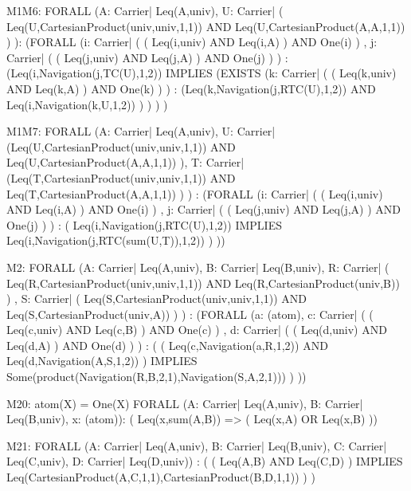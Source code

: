 \begin{verbnobox}[\tiny]
M1M6:
	FORALL (A: Carrier| Leq(A,univ), 
				    U: Carrier| ( Leq(U,CartesianProduct(univ,univ,1,1)) AND Leq(U,CartesianProduct(A,A,1,1)) ) ): 
	   (FORALL (i: Carrier|  (  ( Leq(i,univ) AND Leq(i,A) )  AND One(i) ) , 
				j: Carrier|  (  ( Leq(j,univ) AND Leq(j,A) )  AND One(j) ) ) :
		(Leq(i,Navigation(j,TC(U),1,2))
		IMPLIES 
			(EXISTS (k: Carrier|  (  ( Leq(k,univ) AND Leq(k,A) )  AND One(k) ) ) : 
				(Leq(k,Navigation(j,RTC(U),1,2)) AND Leq(i,Navigation(k,U,1,2)) ) ) ) )
\end{verbnobox}

\begin{verbnobox}[\tiny]
M1M7:
	FORALL (A: Carrier| Leq(A,univ), 
		   U: Carrier| (Leq(U,CartesianProduct(univ,univ,1,1)) AND Leq(U,CartesianProduct(A,A,1,1)) ),
		   T: Carrier| (Leq(T,CartesianProduct(univ,univ,1,1)) AND Leq(T,CartesianProduct(A,A,1,1)) ) ) : 
	  (FORALL (i: Carrier|  (  ( Leq(i,univ) AND Leq(i,A) )  AND One(i) ) , 
			   j: Carrier|  (  ( Leq(j,univ) AND Leq(j,A) )  AND One(j) ) ) : 
		  ( Leq(i,Navigation(j,RTC(U),1,2)) IMPLIES Leq(i,Navigation(j,RTC(sum(U,T)),1,2)) ) ))
\end{verbnobox}

\begin{verbnobox}[\tiny]
M2:	
	FORALL (A: Carrier| Leq(A,univ), 
		   B: Carrier| Leq(B,univ), 
		   R: Carrier| ( Leq(R,CartesianProduct(univ,univ,1,1)) AND Leq(R,CartesianProduct(univ,B)) ) , 
		   S: Carrier| ( Leq(S,CartesianProduct(univ,univ,1,1)) AND Leq(S,CartesianProduct(univ,A)) ) ) : 
	  (FORALL (a: (atom), 
			   c: Carrier| ( ( Leq(c,univ) AND Leq(c,B) )  AND One(c) ) , 
			   d: Carrier| ( ( Leq(d,univ) AND Leq(d,A) )  AND One(d) ) ) :  
			(  ( Leq(c,Navigation(a,R,1,2)) AND Leq(d,Navigation(A,S,1,2)) )  IMPLIES 
					Some(product(Navigation(R,B,2,1),Navigation(S,A,2,1))) ) ))
\end{verbnobox}

\begin{verbnobox}[\tiny]
M20:
 	atom(X) = One(X)
	FORALL (A: Carrier| Leq(A,univ), B: Carrier| Leq(B,univ), x: (atom)):
		 ( Leq(x,sum(A,B)) => ( Leq(x,A) OR Leq(x,B) ))
\end{verbnobox}

\begin{verbnobox}[\tiny]
M21:
	FORALL (A: Carrier| Leq(A,univ), 
		   B: Carrier| Leq(B,univ), 
		   C: Carrier| Leq(C,univ), 
		   D: Carrier| Leq(D,univ)) :
  ( ( Leq(A,B) AND Leq(C,D) )  IMPLIES Leq(CartesianProduct(A,C,1,1),CartesianProduct(B,D,1,1)) ) )
\end{verbnobox}

